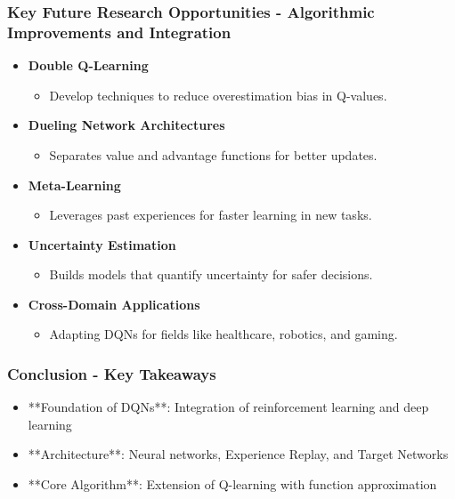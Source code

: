 \documentclass[aspectratio=169]{beamer}
\begin{document}
\begin{frame}[fragile]
    \frametitle{Key Future Research Opportunities - Algorithmic Improvements and Integration}
    \begin{itemize}
        \item \textbf{Double Q-Learning}
            \begin{itemize}
                \item Develop techniques to reduce overestimation bias in Q-values.
            \end{itemize}
        \item \textbf{Dueling Network Architectures}
            \begin{itemize}
                \item Separates value and advantage functions for better updates.
            \end{itemize}
        \item \textbf{Meta-Learning}
            \begin{itemize}
                \item Leverages past experiences for faster learning in new tasks.
            \end{itemize}
    \end{itemize}

    \begin{itemize}
        \item \textbf{Uncertainty Estimation}
            \begin{itemize}
                \item Builds models that quantify uncertainty for safer decisions.
            \end{itemize}
        \item \textbf{Cross-Domain Applications}
            \begin{itemize}
                \item Adapting DQNs for fields like healthcare, robotics, and gaming.
            \end{itemize}
    \end{itemize}
\end{frame}

\begin{frame}[fragile]
  \frametitle{Conclusion - Key Takeaways}
  
  \begin{itemize}
    \item **Foundation of DQNs**: Integration of reinforcement learning and deep learning 
    \item **Architecture**: Neural networks, Experience Replay, and Target Networks 
    \item **Core Algorithm**: Extension of Q-learning with function approximation 
  \end{itemize}

\end{frame}
\end{document}
